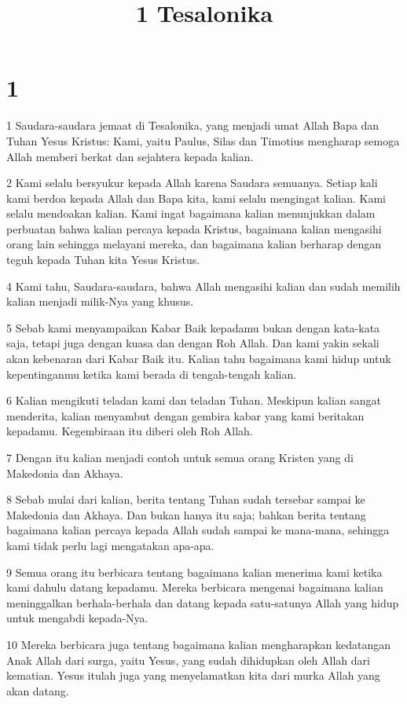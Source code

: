 

\title{1 Tesalonika}


\chapter{1}

\par 1 Saudara-saudara jemaat di Tesalonika, yang menjadi umat Allah Bapa dan Tuhan Yesus Kristus: Kami, yaitu Paulus, Silas dan Timotius mengharap semoga Allah memberi berkat dan sejahtera kepada kalian.
\par 2 Kami selalu bersyukur kepada Allah karena Saudara semuanya. Setiap kali kami berdoa kepada Allah dan Bapa kita, kami selalu mengingat kalian. Kami selalu mendoakan kalian. Kami ingat bagaimana kalian menunjukkan dalam perbuatan bahwa kalian percaya kepada Kristus, bagaimana kalian mengasihi orang lain sehingga melayani mereka, dan bagaimana kalian berharap dengan teguh kepada Tuhan kita Yesus Kristus.
\par 4 Kami tahu, Saudara-saudara, bahwa Allah mengasihi kalian dan sudah memilih kalian menjadi milik-Nya yang khusus.
\par 5 Sebab kami menyampaikan Kabar Baik kepadamu bukan dengan kata-kata saja, tetapi juga dengan kuasa dan dengan Roh Allah. Dan kami yakin sekali akan kebenaran dari Kabar Baik itu. Kalian tahu bagaimana kami hidup untuk kepentinganmu ketika kami berada di tengah-tengah kalian.
\par 6 Kalian mengikuti teladan kami dan teladan Tuhan. Meskipun kalian sangat menderita, kalian menyambut dengan gembira kabar yang kami beritakan kepadamu. Kegembiraan itu diberi oleh Roh Allah.
\par 7 Dengan itu kalian menjadi contoh untuk semua orang Kristen yang di Makedonia dan Akhaya.
\par 8 Sebab mulai dari kalian, berita tentang Tuhan sudah tersebar sampai ke Makedonia dan Akhaya. Dan bukan hanya itu saja; bahkan berita tentang bagaimana kalian percaya kepada Allah sudah sampai ke mana-mana, sehingga kami tidak perlu lagi mengatakan apa-apa.
\par 9 Semua orang itu berbicara tentang bagaimana kalian menerima kami ketika kami dahulu datang kepadamu. Mereka berbicara mengenai bagaimana kalian meninggalkan berhala-berhala dan datang kepada satu-satunya Allah yang hidup untuk mengabdi kepada-Nya.
\par 10 Mereka berbicara juga tentang bagaimana kalian mengharapkan kedatangan Anak Allah dari surga, yaitu Yesus, yang sudah dihidupkan oleh Allah dari kematian. Yesus itulah juga yang menyelamatkan kita dari murka Allah yang akan datang.

